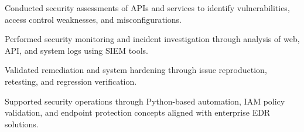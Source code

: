 

\vspace{1mm}

\begin{cvitems}
  \item {Conducted security assessments of APIs and services to identify vulnerabilities, access control weaknesses, and misconfigurations.}
  \item {Performed security monitoring and incident investigation through analysis of web, API, and system logs using SIEM tools.}
  \item {Validated remediation and system hardening through issue reproduction, retesting, and regression verification.}
  \item {Supported security operations through Python-based automation, IAM policy validation, and endpoint protection concepts aligned with enterprise EDR solutions.}
\end{cvitems}

\vspace{4mm}



